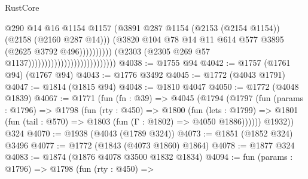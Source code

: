 \begin{lexlean}{RustCore}
\begin{coremodule}
                                                                      @290
                                                                      @14
                                                                      @16
                                                                      @1154
                                                                      @1157
                                                                      (@3891
                                                                        @287
                                                                        @1154
                                                                        (@2153 (@2154 @1154))
                                                                        (@2158 (@2160 @287 @14)))
                                                                      (@3820
                                                                        @104
                                                                        @78
                                                                        @14
                                                                        @11
                                                                        @614
                                                                        @577
                                                                        @3895
                                                                        (@2625 @3792 @496))))))))))
                                                      (@2303
                                                        (@2305
                                                          @269
                                                          @57
                                                          @1137)))))))))))))))))))))))))))
@4038 := @1755 @94
@4042 := @1757 (@1761 @94) (@1767 @94)
@4043 := @1776 @3492
@4045 := @1772 (@4043 @1791)
@4047 := @1814 (@1815 @94)
@4048 := @1810 @4047
@4050 := @1772 (@4048 @1839)
@4067 := @1771
    (fun (fn : @39) =>
    @4045
      (@1794
        (@1797
          (fun (params : @1796) =>
          @1798
            (fun (rty : @450) =>
            @1800
              (fun (lets : @1799) =>
              @1801 (fun (tail : @570) => @1803 (fun (Γ : @1802) => @4050 @1886))))))
        @1932))
    @324
@4070 := @1938 (@4043 (@1789 @324))
@4073 := @1851 (@1852 @324) @3496
@4077 := @1772 (@1843 (@4073 @1860) @1864)
@4078 := @1877 @324
@4083 := @1874 (@1876 @4078 @3500 @1832 @1834)
@4094 := fun (params : @1796) =>
  @1798
    (fun (rty : @450) =>

\end{coremodule}
\end{lexlean}
